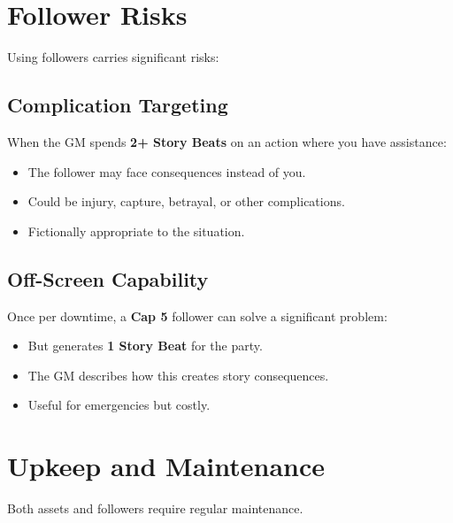 \section{Follower Risks}

Using followers carries significant risks:

\subsection*{Complication Targeting}
When the GM spends \textbf{2+ Story Beats} on an action where you have assistance:
\begin{itemize}
\item The follower may face consequences instead of you.
\item Could be injury, capture, betrayal, or other complications.
\item Fictionally appropriate to the situation.
\end{itemize}

\subsection*{Off-Screen Capability}
Once per downtime, a \textbf{Cap 5} follower can solve a significant problem:
\begin{itemize}
\item But generates \textbf{1 Story Beat} for the party.
\item The GM describes how this creates story consequences.
\item Useful for emergencies but costly.
\end{itemize}

\section{Upkeep and Maintenance}

Both assets and followers require regular maintenance.

